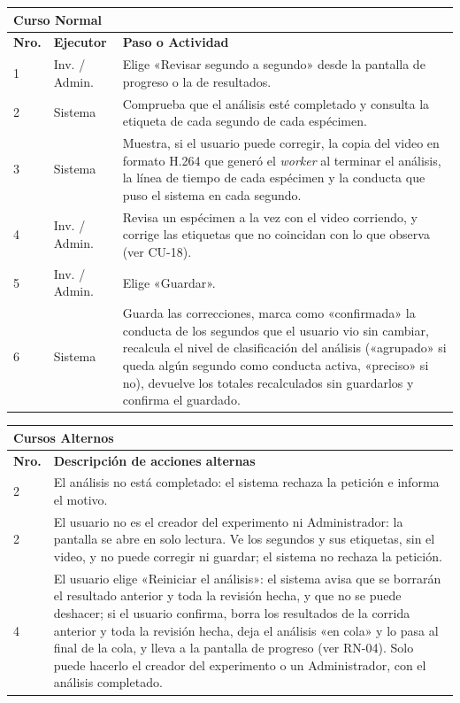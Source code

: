 \noindent
\begin{tabular}{|p{1.0cm}|p{3.7cm}|p{9.5cm}|}
\hline
\multicolumn{3}{|l|}{\textbf{Curso Normal}} \\
\hline
\textbf{Nro.} & \textbf{Ejecutor} & \textbf{Paso o Actividad} \\
\hline
1 & Inv. / Admin. & Elige «Revisar segundo a segundo» desde la pantalla de progreso o la de resultados. \\
\hline
2 & Sistema & Comprueba que el análisis esté completado y consulta la etiqueta de cada segundo de cada espécimen. \\
\hline
3 & Sistema & Muestra, si el usuario puede corregir, la copia del video en formato H.264 que generó el \textit{worker} al terminar el análisis, la línea de tiempo de cada espécimen y la conducta que puso el sistema en cada segundo. \\
\hline
4 & Inv. / Admin. & Revisa un espécimen a la vez con el video corriendo, y corrige las etiquetas que no coincidan con lo que observa (ver CU-18). \\
\hline
5 & Inv. / Admin. & Elige «Guardar». \\
\hline
6 & Sistema & Guarda las correcciones, marca como «confirmada» la conducta de los segundos que el usuario vio sin cambiar, recalcula el nivel de clasificación del análisis («agrupado» si queda algún segundo como conducta activa, «preciso» si no), devuelve los totales recalculados sin guardarlos y confirma el guardado. \\
\hline
\end{tabular}

\noindent
\begin{tabular}{|p{1.0cm}|p{13.6cm}|}
\hline
\multicolumn{2}{|l|}{\textbf{Cursos Alternos}} \\
\hline
\textbf{Nro.} & \textbf{Descripción de acciones alternas} \\
\hline
2 & El análisis no está completado: el sistema rechaza la petición e informa el motivo. \\
\hline
2 & El usuario no es el creador del experimento ni Administrador: la pantalla se abre en solo lectura. Ve los segundos y sus etiquetas, sin el video, y no puede corregir ni guardar; el sistema no rechaza la petición. \\
\hline
4 & El usuario elige «Reiniciar el análisis»: el sistema avisa que se borrarán el resultado anterior y toda la revisión hecha, y que no se puede deshacer; si el usuario confirma, borra los resultados de la corrida anterior y toda la revisión hecha, deja el análisis «en cola» y lo pasa al final de la cola, y lleva a la pantalla de progreso (ver RN-04). Solo puede hacerlo el creador del experimento o un Administrador, con el análisis completado. \\
\hline
\end{tabular}

